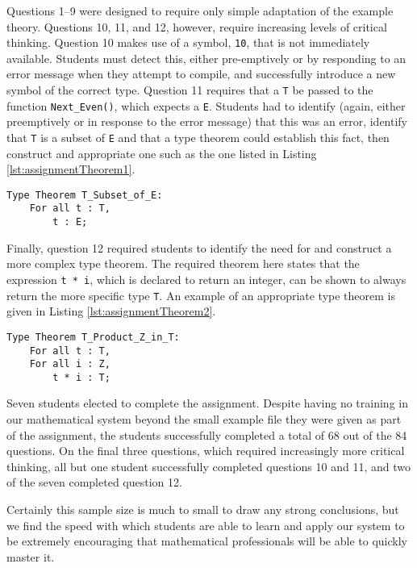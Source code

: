 Questions 1--9 were designed to require only simple adaptation of the example theory.  Questions 10, 11, and 12, however, require increasing levels of critical thinking.  Question 10 makes use of a symbol, \texttt{10}, that is not immediately available.  Students must detect this, either pre-emptively or by responding to an error message when they attempt to compile, and successfully introduce a new symbol of the correct type.  Question 11 requires that a \texttt{T} be passed to the function \texttt{Next\_Even()}, which expects a \texttt{E}.  Students had to identify (again, either preemptively or in response to the error message) that this was an error, identify that \texttt{T} is a subset of \texttt{E} and that a type theorem could establish this fact, then construct and appropriate one such as the one listed in Listing \ref{lst:assignmentTheorem1}.

\begin{lstlisting}[float=h,language=resolve,caption={A type theorem stating that \texttt{T} is a subset of \texttt{E}\label{lst:assignmentTheorem1}}]
Type Theorem T_Subset_of_E:
	For all t : T,
		t : E;
\end{lstlisting}

Finally, question 12 required students to identify the need for and construct a more complex type theorem.  The required theorem here states that the expression \texttt{t~*~i}, which is declared to return an integer, can be shown to always return the more specific type \texttt{T}.  An example of an appropriate type theorem is given in Listing \ref{lst:assignmentTheorem2}.

\begin{lstlisting}[float=h,language=resolve,caption={A type theorem stating that \texttt{t~*~i} returns a \texttt{T}\label{lst:assignmentTheorem2}}]
Type Theorem T_Product_Z_in_T:
	For all t : T,
	For all i : Z,
		t * i : T;
\end{lstlisting}

Seven students elected to complete the assignment.  Despite having no training in our mathematical system beyond the small example file they were given as part of the assignment, the students successfully completed a total of 68 out of the 84 questions.  On the final three questions, which required increasingly more critical thinking, all but one student successfully completed questions 10 and 11, and two of the seven completed question 12.

Certainly this sample size is much to small to draw any strong conclusions, but we find the speed with which students are able to learn and apply our system to be extremely encouraging that mathematical professionals will be able to quickly master it.
